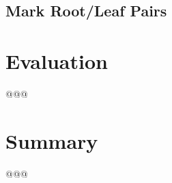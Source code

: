 \documentclass[letterpaper,twocolumn,10pt]{article}
\begin{document}
\subsection{Mark Root/Leaf Pairs}
\label{sec:Mark Root/Leaf Pairs}



\section{Evaluation}
\label{sec:Evaluation}

@@@

\section{Summary}
\label{sec:Summary}

@@@

%
%

%







\end{document}
